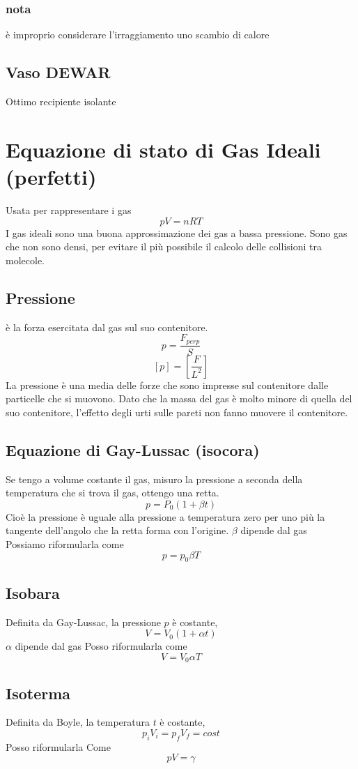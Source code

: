 \documentclass[a4paper]{report}
\begin{document}
  \subsubsection{nota}
  è improprio considerare l'irraggiamento uno scambio di calore
  \subsection{Vaso DEWAR}
  Ottimo recipiente isolante

  \section{Equazione di stato di Gas Ideali (perfetti)}
  Usata per rappresentare i gas
  $$ pV = nRT $$
  I gas ideali sono una buona approssimazione dei gas a bassa pressione. Sono gas che non sono densi, per evitare il più possibile il calcolo delle collisioni tra molecole.
  \subsection{Pressione}
  è la forza esercitata dal gas sul suo contenitore.
  $$p = \frac{F_{perp}}{S}$$
  $$[p]=[\frac{F}{L^2}]$$
  La pressione è una media delle forze che sono impresse sul contenitore dalle particelle che si muovono. Dato che la massa del gas è molto minore di quella del suo contenitore, l'effetto degli urti sulle pareti non fanno muovere il contenitore.
  \subsection{Equazione di Gay-Lussac (isocora)}
  Se tengo a volume costante il gas, misuro la pressione a seconda della temperatura che si trova il gas, ottengo una retta.
  $$ p = P_0 (1 + \beta t)$$
  Cioè la pressione è uguale alla pressione a temperatura zero per uno più la tangente dell'angolo che la retta forma con l'origine. $\beta$ dipende dal gas\\
  Possiamo riformularla come
  $$ p = p_0 \beta T$$

  \subsection{Isobara}
  Definita da Gay-Lussac, la pressione $p$ è costante,
  $$ V = V_0(1 + \alpha t) $$
  $\alpha$ dipende dal gas
  Posso riformularla come
  $$V = V_0 \alpha T$$
  \subsection{Isoterma}
  Definita da Boyle, la temperatura $t$ è costante,
  $$ p_i V_i = p_f V_f = cost$$
  Posso riformularla Come
  $$pV = \gamma $$
\end{document}

